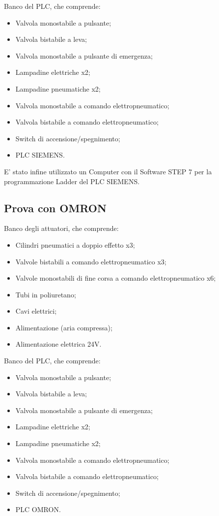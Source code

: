 \documentclass[a4paper]{article}
\begin{document}
Banco del PLC, che comprende:
\begin{itemize}
\item Valvola monostabile a pulsante;
\item Valvola bistabile a leva;
\item Valvola monostabile a pulsante di emergenza;
\item Lampadine elettriche x2;
\item Lampadine pneumatiche x2;
\item Valvola monostabile a comando elettropneumatico;
\item Valvola bistabile a comando elettropneumatico;
\item Switch di accensione/spegnimento;
\item PLC SIEMENS.
\end{itemize}
E' stato infine utilizzato un Computer con il Software STEP 7 per la programmazione Ladder del PLC SIEMENS.


\subsection{Prova con OMRON}
Banco degli attuatori, che comprende:
\begin{itemize}
\item Cilindri pneumatici a doppio effetto x3;
\item Valvole bistabili a comando elettropneumatico x3;
\item Valvole monostabili di fine corsa a comando elettropneumatico x6;
\item Tubi in poliuretano;
\item Cavi elettrici;
\item Alimentazione (aria compressa);
\item Alimentazione elettrica 24V.
\end{itemize}

Banco del PLC, che comprende:
\begin{itemize}
\item Valvola monostabile a pulsante;
\item Valvola bistabile a leva;
\item Valvola monostabile a pulsante di emergenza;
\item Lampadine elettriche x2;
\item Lampadine pneumatiche x2;
\item Valvola monostabile a comando elettropneumatico;
\item Valvola bistabile a comando elettropneumatico;
\item Switch di accensione/spegnimento;
\item PLC OMRON.
\end{itemize}
\end{document}
